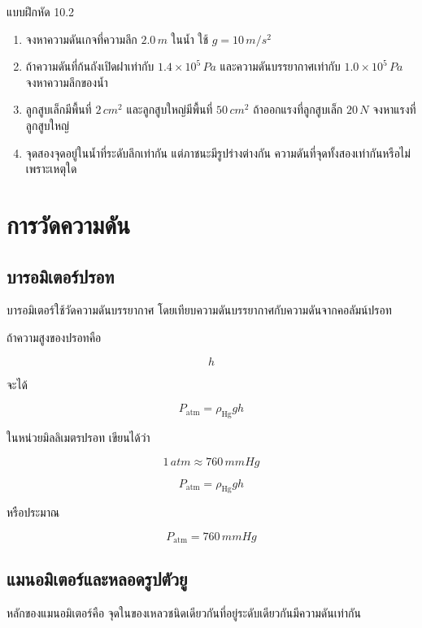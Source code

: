 \begin{exercisebox}{แบบฝึกหัด 10.2}
\begin{enumerate}
    \item จงหาความดันเกจที่ความลึก $2.0\,\si{m}$ ในน้ำ ใช้ $g=10\,\si{m/s^2}$
    \item ถ้าความดันที่ก้นถังเปิดฝาเท่ากับ $1.4\times 10^5\,\si{Pa}$ และความดันบรรยากาศเท่ากับ $1.0\times 10^5\,\si{Pa}$ จงหาความลึกของน้ำ
    \item ลูกสูบเล็กมีพื้นที่ $2\,\si{cm^2}$ และลูกสูบใหญ่มีพื้นที่ $50\,\si{cm^2}$ ถ้าออกแรงที่ลูกสูบเล็ก $20\,\si{N}$ จงหาแรงที่ลูกสูบใหญ่
    \item จุดสองจุดอยู่ในน้ำที่ระดับลึกเท่ากัน แต่ภาชนะมีรูปร่างต่างกัน ความดันที่จุดทั้งสองเท่ากันหรือไม่ เพราะเหตุใด
\end{enumerate}
\end{exercisebox}

\section{การวัดความดัน}

\subsection{บารอมิเตอร์ปรอท}

บารอมิเตอร์ใช้วัดความดันบรรยากาศ โดยเทียบความดันบรรยากาศกับความดันจากคอลัมน์ปรอท

ถ้าความสูงของปรอทคือ

\[
h
\]

จะได้

\[
P_{\text{atm}}=\rho_{\text{Hg}}gh
\]

ในหน่วยมิลลิเมตรปรอท เขียนได้ว่า

\[
1\,\si{atm}\approx 760\,\si{mmHg}
\]

\begin{tcolorbox}[title=บารอมิเตอร์]
\[
P_{\text{atm}}=\rho_{\text{Hg}}gh
\]

หรือประมาณ

\[
P_{\text{atm}}=760\,\si{mmHg}
\]
\end{tcolorbox}

\subsection{แมนอมิเตอร์และหลอดรูปตัวยู}

หลักของแมนอมิเตอร์คือ จุดในของเหลวชนิดเดียวกันที่อยู่ระดับเดียวกันมีความดันเท่ากัน

